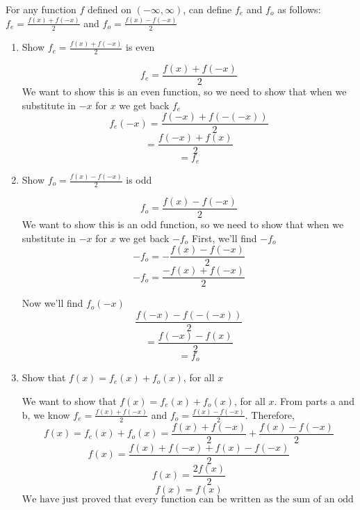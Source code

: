 \documentclass[handout]{ximera}
\begin{document}
\begin{problem}
For any function $f$ defined on $(-\infty,\infty)$, can define $f_e$ and $f_o$ as follows: $f_e=\frac{f(x)+f(-x)}{2}$ and $f_o=\frac{f(x)-f(-x)}{2}$


\begin{enumerate}	
	\item  Show  $f_e=\frac{f(x)+f(-x)}{2}$  is even
		\begin{freeResponse}	
			 $$f_e=\frac{f(x)+f(-x)}{2}$$
			We want to show this is an even function, so we need to show that when we substitute in $-x$ for $x$ we get back $f_e$
			$$f_e(-x)=\frac{f(-x)+f(-(-x))}{2}$$ 
			$$=\frac{f(-x)+f(x)}{2}$$
			$$=f_e$$
		\end{freeResponse}

	\item  Show $f_o=\frac{f(x)-f(-x)}{2}$ is odd
		\begin{freeResponse}	
			 $$f_o=\frac{f(x)-f(-x)}{2}$$
			We want to show this is an odd function, so we need to show that when we substitute in $-x$ for $x$ we get back $-f_o$
			First, we'll find $-f_o$
			$$-f_o=-\frac{f(x)-f(-x)}{2}$$
			$$-f_o=\frac{-f(x)+f(-x)}{2}$$

			Now we'll find $f_o(-x)$
			$$\frac{f(-x)-f(-(-x))}{2}$$ 
			$$=\frac{f(-x)-f(x)}{2}$$
			$$=f_o$$
		\end{freeResponse}
	\item Show that $f(x)=f_e(x)+f_o(x)$, for all $x$
		\begin{freeResponse}
		
		We want to show that $f(x)=f_e(x)+f_o(x)$, for all $x$.  From parts a and b, we know $f_e=\frac{f(x)+f(-x)}{2}$ and $f_o=\frac{f(x)-f(-x)}{2}$.  Therefore,
			$$f(x)=f_e(x)+f_o(x)=\frac{f(x)+f(-x)}{2}+\frac{f(x)-f(-x)}{2}$$
			$$f(x)=\frac{f(x)+f(-x)+f(x)-f(-x)}{2}$$
			$$f(x)=\frac{2f(x)}{2}$$
			$$f(x)=f(x)$$
			$$\text{We have just proved that every function can be written as the sum of an odd function and an even function.}$$
	
		\end{freeResponse}	
	\end{enumerate}
	

\end{problem}

\begin{instructorNotes}

\end{instructorNotes}
\end{document}
